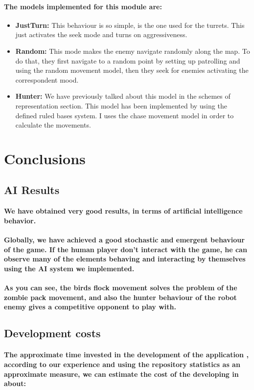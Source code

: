 \documentclass[a4paper,10pt]{article}
\newcommand{\p}[1]{\paragraph{\indent\textnormal{#1}}}
\begin{document}
      \p{The models implemented for this module are:}

    \begin{itemize}
     \item \textbf{JustTurn:} This behaviour is so simple, is the one used for the turrets. This just activates the seek mode and turns on aggressiveness.
     \item \textbf{Random:} This mode makes the enemy navigate randomly along the map. To do that, they first navigate to a random point by setting up patrolling and using the random movement model, then they seek for enemies activating the correspondent mood.
     \item \textbf{Hunter:} We have previously talked about this model in the schemes of representation section. This model has been implemented by using the defined ruled bases system. I uses the chase movement model in order to calculate the movements.
    \end{itemize}


\section{Conclusions}

  \subsection{AI Results}
    \p{We have obtained very good results, in terms of artificial intelligence behavior.}

    \p{Globally, we have achieved a good stochastic and emergent behaviour of the game. If the human player don't interact with the game, he can observe many of the elements behaving and interacting by themselves using the AI system we implemented.}

    \p{As you can see, the birds flock movement solves the problem of the zombie pack movement, and also the hunter behaviour of the robot enemy gives a competitive opponent to play with.}

  \subsection{Development costs}
    \p{The approximate time invested in the development of the application , according to our experience and using the repository statistics as an approximate measure, we can estimate the cost of the developing in about: \newline}
\end{document}
